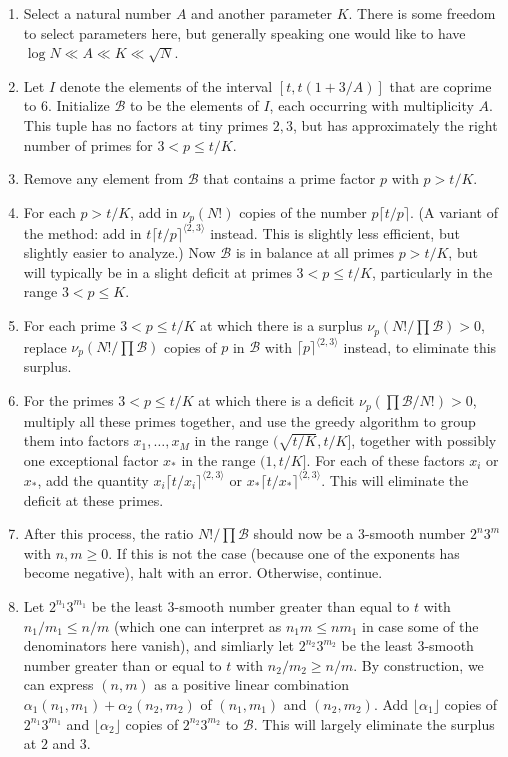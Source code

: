 \documentclass[12pt,a4paper,reqno]{amsart}
\numberwithin{equation}{section}
\theoremstyle{plain}
\theoremstyle{definition}
\newcommand\tuple{{\mathcal B}}
\begin{document}
\begin{enumerate}
\item Select a natural number $A$ and another parameter $K$.  There is some freedom to select parameters here, but generally speaking one would like to have $\log N \ll A \ll K \ll \sqrt{N}$.
\item Let $I$ denote the elements of the interval $[t,t(1+3/A)]$ that are coprime to $6$.  Initialize $\tuple$ to be the elements of $I$, each occurring with multiplicity $A$.  This tuple has no factors at tiny primes $2,3$, but has approximately the right number of primes for $3 < p \leq t/K$.
\item Remove any element from $\tuple$ that contains a prime factor $p$ with $p > t/K$.
\item For each $p > t/K$, add in $\nu_p(N!)$ copies of the number $p \lceil t/p \rceil$.  (A variant of the method: add in $t \lceil t/p \rceil^{\langle 2,3\rangle}$ instead. This is slightly less efficient, but slightly easier to analyze.)  Now $\tuple$ is in balance at all primes $p>t/K$, but will typically be in a slight deficit at primes $3 < p \leq t/K$, particularly in the range $3 < p \leq K$.
\item For each prime $3 < p \leq t/K$ at which there is a surplus $\nu_p(N!/\prod \tuple) > 0$, replace $\nu_p(N!/\prod \tuple)$ copies of $p$ in $\tuple$ with $\lceil p \rceil^{\langle 2,3 \rangle}$ instead, to eliminate this surplus. 
\item For the primes $3 < p \leq t/K$ at which there is a deficit $\nu_p(\prod \tuple/N!) > 0$, multiply all these primes together, and use the greedy algorithm to group them into factors $x_1, \dots, x_M$ in the range
$(\sqrt{t/K}, t/K]$, together with possibly one exceptional factor $x_*$ in the range $(1, t/K]$.  For each of these factors $x_i$ or $x_*$, add the quantity $x_i \lceil t/x_i \rceil^{\langle 2,3 \rangle}$ or $x_* \lceil t/x_* \rceil^{\langle 2,3 \rangle}$.  This will eliminate the deficit at these primes.
\item After this process, the ratio $N!/\prod \tuple$ should now be a $3$-smooth number $2^n 3^m$ with $n,m \geq 0$. If this is not the case (because one of the exponents has become negative), halt with an error.  Otherwise, continue.
\item Let $2^{n_1} 3^{m_1}$ be the least $3$-smooth number greater than equal to $t$ with $n_1/m_1 \leq n/m$ (which one can interpret as $n_1 m \leq nm_1$ in case some of the denominators here vanish), and simliarly let $2^{n_2} 3^{m_2}$ be the least $3$-smooth number greater than or equal to $t$ with $n_2/m_2 \geq n/m$.  By construction, we can express $(n,m)$ as a positive linear combination $\alpha_1 (n_1,m_1) + \alpha_2 (n_2,m_2)$ of $(n_1,m_1)$ and $(n_2,m_2)$.  Add $\lfloor \alpha_1 \rfloor$ copies of $2^{n_1} 3^{m_1}$ and $\lfloor \alpha_2 \rfloor$ copies of $2^{n_2} 3^{m_2}$ to $\tuple$.  This will largely eliminate the surplus at $2$ and $3$.
\end{enumerate}
\end{document}
